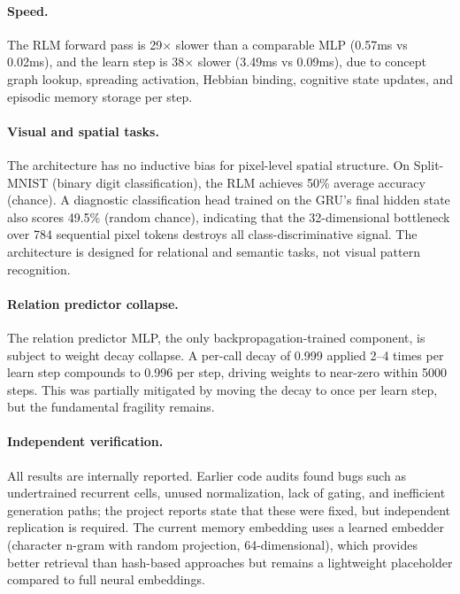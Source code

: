 \documentclass[11pt]{article}
\begin{document}
\paragraph{Speed.}
The RLM forward pass is 29$\times$ slower than a comparable MLP (0.57ms vs 0.02ms), and the learn step is 38$\times$ slower (3.49ms vs 0.09ms), due to concept graph lookup, spreading activation, Hebbian binding, cognitive state updates, and episodic memory storage per step.

\paragraph{Visual and spatial tasks.}
The architecture has no inductive bias for pixel-level spatial structure. On Split-MNIST (binary digit classification), the RLM achieves 50\% average accuracy (chance). A diagnostic classification head trained on the GRU's final hidden state also scores 49.5\% (random chance), indicating that the 32-dimensional bottleneck over 784 sequential pixel tokens destroys all class-discriminative signal. The architecture is designed for relational and semantic tasks, not visual pattern recognition.

\paragraph{Relation predictor collapse.}
The relation predictor MLP, the only backpropagation-trained component, is subject to weight decay collapse. A per-call decay of 0.999 applied 2--4 times per learn step compounds to 0.996 per step, driving weights to near-zero within 5000 steps. This was partially mitigated by moving the decay to once per learn step, but the fundamental fragility remains.

\paragraph{Independent verification.}
All results are internally reported. Earlier code audits found bugs such as undertrained recurrent cells, unused normalization, lack of gating, and inefficient generation paths; the project reports state that these were fixed, but independent replication is required. The current memory embedding uses a learned embedder (character n-gram with random projection, 64-dimensional), which provides better retrieval than hash-based approaches but remains a lightweight placeholder compared to full neural embeddings.
\end{document}
